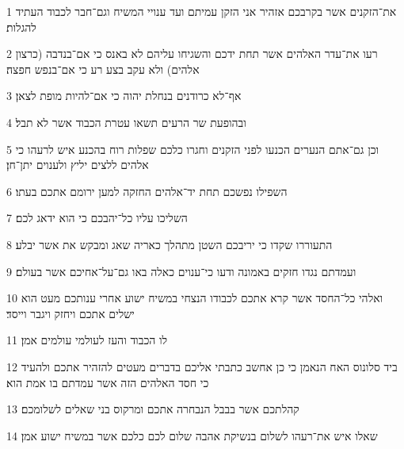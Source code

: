 \par 1 את־הזקנים אשר בקרבכם אזהיר אני הזקן עמיתם ועד ענויי המשיח וגם־חבר לכבוד העתיד להגלות׃
\par 2 רעו את־עדר האלהים אשר תחת ידכם והשגיחו עליהם לא באנס כי אם־בנדבה (כרצון אלהים) ולא עקב בצע רע כי אם־בנפש חפצה׃
\par 3 אף־לא כרודנים בנחלת יהוה כי אם־להיות מופת לצאן׃
\par 4 ובהופעת שר הרעים תשאו עטרת הכבוד אשר לא תבל׃
\par 5 וכן גם־אתם הנערים הכנעו לפני הזקנים וחגרו כלכם שפלות רוח בהכנע איש לרעהו כי אלהים ללצים יליץ ולענוים יתן־חן׃
\par 6 השפילו נפשכם תחת יד־אלהים החזקה למען ירומם אתכם בעתו׃
\par 7 השליכו עליו כל־יהבכם כי הוא ידאג לכם׃
\par 8 התעוררו שקדו כי יריבכם השטן מתהלך כאריה שאג ומבקש את אשר יבלע׃
\par 9 ועמדתם נגדו חזקים באמונה ודעו כי־ענוים כאלה באו גם־על־אחיכם אשר בעולם׃
\par 10 ואלהי כל־החסד אשר קרא אתכם לכבודו הנצחי במשיח ישוע אחרי ענותכם מעט הוא ישלים אתכם ויחזק ויגבר וייסד׃
\par 11 לו הכבוד והעז לעולמי עולמים אמן׃
\par 12 ביד סלונוס האח הנאמן כי כן אחשב כתבתי אליכם בדברים מעטים להזהיר אתכם ולהעיד כי חסד האלהים הזה אשר עמדתם בו אמת הוא׃
\par 13 קהלתכם אשר בבבל הנבחרה אתכם ומרקוס בני שאלים לשלומכם׃
\par 14 שאלו איש את־רעהו לשלום בנשיקת אהבה שלום לכם כלכם אשר במשיח ישוע אמן׃


